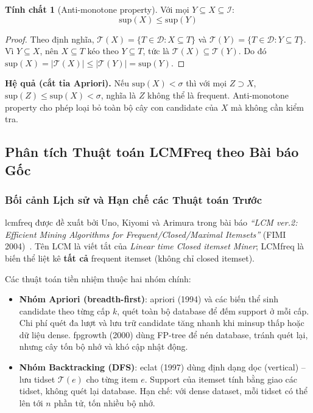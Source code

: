 \documentclass[12pt,a4paper]{article}
\newcommand{\supp}{\mathrm{sup}}
\theoremstyle{definition}
\newtheorem{property}{Tính chất}[section]
\begin{document}
\begin{property}[Anti-monotone property]
\label{prop:antimonotone}
Với mọi $Y \subseteq X \subseteq \mathcal{I}$:
\[
    \supp(X) \leq \supp(Y)
\]
\end{property}

\begin{proof}
Theo định nghĩa, $\mathcal{T}(X) = \{T \in \mathcal{D} : X \subseteq T\}$ và $\mathcal{T}(Y) = \{T \in \mathcal{D} : Y \subseteq T\}$. Vì $Y \subseteq X$, nên $X \subseteq T$ kéo theo $Y \subseteq T$, tức là $\mathcal{T}(X) \subseteq \mathcal{T}(Y)$. Do đó $\supp(X) = |\mathcal{T}(X)| \leq |\mathcal{T}(Y)| = \supp(Y)$.
\end{proof}

\textbf{Hệ quả (cắt tỉa Apriori).} Nếu $\supp(X) < \sigma$ thì với mọi $Z \supset X$, $\supp(Z) \leq \supp(X) < \sigma$, nghĩa là $Z$ không thể là frequent. Anti-monotone property cho phép loại bỏ toàn bộ cây con candidate của $X$ mà không cần kiểm tra.

\subsection{Phân tích Thuật toán LCMFreq theo Bài báo Gốc}

\subsubsection{Bối cảnh Lịch sử và Hạn chế các Thuật toán Trước}

\gls{lcmfreq} được đề xuất bởi Uno, Kiyomi và Arimura trong bài báo \textit{``LCM ver.2: Efficient Mining Algorithms for Frequent/Closed/Maximal Itemsets''} (FIMI 2004)~\cite{uno2004}. Tên LCM là viết tắt của \textit{Linear time Closed itemset Miner}; LCMfreq là biến thể liệt kê \textbf{tất cả} frequent itemset (không chỉ closed itemset).

Các thuật toán tiền nhiệm thuộc hai nhóm chính:

\begin{itemize}
    \item \textbf{Nhóm Apriori (breadth-first)}: \gls{apriori} (1994) và các biến thể sinh candidate theo từng cấp $k$, quét toàn bộ database để đếm support ở mỗi cấp. Chi phí quét đa lượt và lưu trữ candidate tăng nhanh khi minsup thấp hoặc dữ liệu dense. \gls{fpgrowth} (2000) dùng FP-tree để nén database, tránh quét lại, nhưng cây tốn bộ nhớ và khó cập nhật động.

    \item \textbf{Nhóm Backtracking (DFS)}: \gls{eclat} (1997) dùng định dạng dọc (vertical) -- lưu tidset $\mathcal{T}(e)$ cho từng item $e$. Support của itemset tính bằng giao các tidset, không quét lại database. Hạn chế: với dense dataset, mỗi tidset có thể lên tới $n$ phần tử, tốn nhiều bộ nhớ.
\end{itemize}
\end{document}
